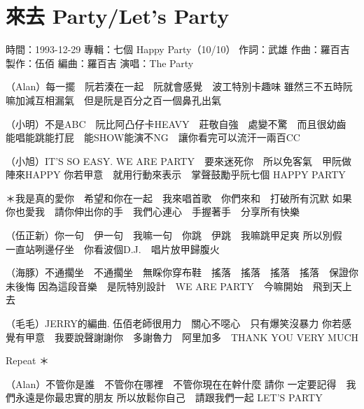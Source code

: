 \documentclass[UTF8,a4paper,oneside,twocolumn,12pt]{ctexbook}
\newcommand{\infopair}[2]{\textbullet #1：#2}
\newcommand{\zc}[1][伍佰]{\infopair{作詞}{#1}}
\newcommand{\zq}[1][伍佰]{\infopair{作曲}{#1}}
\newcommand{\bq}[1][伍佰]{\infopair{編曲}{#1}}
\newcommand{\zj}[1]{\infopair{專輯}{#1}}
\newcommand{\zz}[1]{\infopair{製作}{#1}}
\newcommand{\sj}[1]{\infopair{時間}{#1}}
\newenvironment{info}{\begin{flushleft}\kaishu
	}
	{\end{flushleft}\normalsize\yahei\par}
\newenvironment{lyric}{
	}
{}
\begin{document}
\section{來去 Party/Let's Party}
\begin{info}
	\sj{1993-12-29}
	\zj{七個 Happy Party（10/10）}
	\zc[武雄]
	\zq[羅百吉]
	\zz{伍佰}
	\bq[羅百吉]
	\infopair{演唱}{The Party}
\end{info}
\begin{lyric}
	（Alan）每一擺　阮若湊在一起　阮就會感覺　波工特別卡趣味
	雖然三不五時阮嘛加減互相漏氣　但是阮是百分之百一個鼻孔出氣

	（小明）不是ABC　阮比阿凸仔卡HEAVY　莊敬自強　處變不驚　而且很幼齒
	能唱能跳能打屁　能SHOW能演不NG　讓你看完可以流汗一兩百CC

	（小旭）IT'S SO EASY. WE ARE PARTY　要來迷死你　所以免客氣　甲阮做陣來HAPPY
	你若甲意　就用行動來表示　掌聲鼓勵乎阮七個 HAPPY PARTY

	＊我是真的愛你　希望和你在一起　我來唱首歌　你們來和　打破所有沉默
	如果你也愛我　請你伸出你的手　我們心連心　手握著手　分享所有快樂

	（伍正新）你一句　伊一句　我嘛一句　你跳　伊跳　我嘛跳甲足爽
	所以別假　一直站咧邊仔坐　你看波個D.J.　唱片放甲歸腹火

	（海豚）不通擱坐　不通擱坐　無睬你穿布鞋　搖落　搖落　搖落　搖落　保證你未後悔
	因為這段音樂　是阮特別設計　WE ARE PARTY　今嘛開始　飛到天上去

	（毛毛）JERRY的編曲. 伍佰老師很用力　關心不噁心　只有爆笑沒暴力
	你若感覺有甲意　我要說聲謝謝你　多謝魯力　阿里加多　THANK YOU VERY MUCH

	Repeat ＊

	（Alan）不管你是誰　不管你在哪裡　不管你現在在幹什麼
	請你 一定要記得　我們永遠是你最忠實的朋友
	所以放鬆你自己　請跟我們一起
	LET'S PARTY
\end{lyric}
\end{document}
